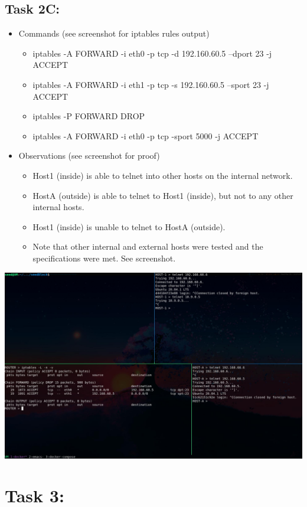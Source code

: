 \documentclass[11pt]{article}
\begin{document}
\subsection*{Task 2C:}
\label{sec:org864d75f}
\begin{itemize}
\item Commands (see screenshot for iptables rules output)
\begin{itemize}
\item iptables -A FORWARD -i eth0 -p tcp -d 192.160.60.5 --dport 23 -j ACCEPT
\item iptables -A FORWARD -i eth1 -p tcp -s 192.160.60.5 --sport 23 -j ACCEPT
\item iptables -P FORWARD DROP
\item iptables -A FORWARD -i eth0 -p tcp -sport 5000 -j ACCEPT
\end{itemize}
\item Observations (see screenshot for proof)
\begin{itemize}
\item Host1 (inside) is able to telnet into other hosts on the internal network.
\item HostA (outside) is able to telnet to Host1 (inside), but not to any other internal hosts.
\item Host1 (inside) is unable to telnet to HostA (outside).
\item Note that other internal and external hosts were tested and the specifications were met. See screenshot.
\end{itemize}
\end{itemize}
\begin{center}
\includegraphics[width=.9\linewidth]{./images/08.jpg}
\end{center}
\section*{Task 3:}
\label{sec:orgc11818a}
\end{document}
